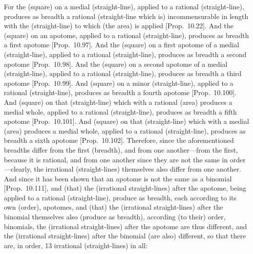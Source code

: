 \begin{Parallel}{}{}
{For the (square) on a medial (straight-line), applied to a rational (straight-line), produces as breadth a rational (straight-line which is) incommensurable in length with the
(straight-line) to which  (the area) is applied [Prop.~10.22]. And the (square) on an apotome, applied to a rational (straight-line), produces as breadth a first apotome [Prop.~10.97]. 
And the (square) on a first
apotome of a medial (straight-line), applied to a rational (straight-line),
produces as breadth a second apotome [Prop.~10.98].
And the (square) on a second
apotome of a medial (straight-line), applied to a rational (straight-line),
produces as breadth a third apotome [Prop.~10.99].
And (square) on a minor (straight-line), applied to a rational (straight-line),
produces as breadth a fourth apotome [Prop.~10.100]. And (square) on that (straight-line) which with a rational (area) produces a medial whole, applied to a rational (straight-line),
produces as breadth a fifth apotome [Prop.~10.101]. And (square) on that (straight-line) which with a medial (area) produces a medial whole, applied to a rational
 (straight-line), produces as breadth a sixth apotome [Prop.~10.102]. Therefore, since the aforementioned breadths differ from the first (breadth), and from one another---from the
first, because it is rational, and from one another since they are not the
same in order---clearly,  the  irrational (straight-lines)
themselves also differ from one another. And since it has been shown that an apotome
is not the same as a binomial [Prop.~10.111],
and (that) the (irrational straight-lines) after the apotome, being applied to
a rational (straight-line), produce as breadth, each according to its own (order), apotomes, and (that) the (irrational straight-lines) after
the binomial  themselves also (produce as breadth), according (to their) order, binomials, 
the (irrational straight-lines) after the apotome are thus different, and the
(irrational straight-lines) after the binomial (are also) different, so that
there are, in order, 13 irrational (straight-lines) in all:}
\end{Parallel}

